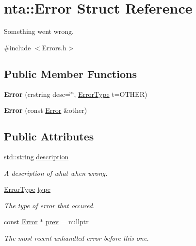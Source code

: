 \hypertarget{structnta_1_1Error}{}\section{nta\+:\+:Error Struct Reference}
\label{structnta_1_1Error}


Something went wrong.  




{\ttfamily \#include $<$Errors.\+h$>$}

\subsection*{Public Member Functions}
\begin{DoxyCompactItemize}
\item 
\mbox{\label{structnta_1_1Error_a6239093a37e2bd25278da1f2be70bcdc}} 
{\bfseries Error} (crstring desc=\char`\"{}\char`\"{}, \hyperlink{namespacenta_a1ddeff35318678e360dfa44ca9577b16}{Error\+Type} t=O\+T\+H\+ER)
\item 
\mbox{\label{structnta_1_1Error_a128f41302dac9b5e1e2b783588b6cb28}} 
{\bfseries Error} (const \hyperlink{structnta_1_1Error}{Error} \&other)
\end{DoxyCompactItemize}
\subsection*{Public Attributes}
\begin{DoxyCompactItemize}
\item 
\mbox{\label{structnta_1_1Error_afd857a214f99264d095d42fcf076318b}} 
std\+::string \hyperlink{structnta_1_1Error_afd857a214f99264d095d42fcf076318b}{description}
\begin{DoxyCompactList}\small\item\em A description of what when wrong. \end{DoxyCompactList}\item 
\mbox{\label{structnta_1_1Error_a7bc9638dee4444ef9306b83a889d4257}} 
\hyperlink{namespacenta_a1ddeff35318678e360dfa44ca9577b16}{Error\+Type} \hyperlink{structnta_1_1Error_a7bc9638dee4444ef9306b83a889d4257}{type}
\begin{DoxyCompactList}\small\item\em The type of error that occured. \end{DoxyCompactList}\item 
\mbox{\label{structnta_1_1Error_a56fe79b4b8e915fa60f580ca80cc4ed7}} 
const \hyperlink{structnta_1_1Error}{Error} $\ast$ \hyperlink{structnta_1_1Error_a56fe79b4b8e915fa60f580ca80cc4ed7}{prev} = nullptr
\begin{DoxyCompactList}\small\item\em The most recent unhandled error before this one. \end{DoxyCompactList}\end{DoxyCompactItemize}


